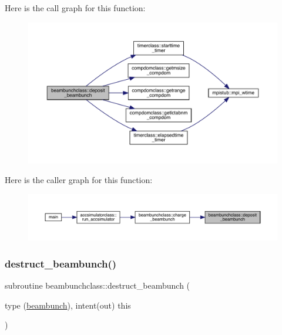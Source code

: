 Here is the call graph for this function\+:\nopagebreak
\begin{figure}[H]
\begin{center}
\leavevmode
\includegraphics[width=350pt]{namespacebeambunchclass_aa0438cba132ce3b2fdc8e053375c0097_cgraph}
\end{center}
\end{figure}
Here is the caller graph for this function\+:\nopagebreak
\begin{figure}[H]
\begin{center}
\leavevmode
\includegraphics[width=350pt]{namespacebeambunchclass_aa0438cba132ce3b2fdc8e053375c0097_icgraph}
\end{center}
\end{figure}
\mbox{\label{namespacebeambunchclass_a0fe1e4d236f209b18f75b272bf07782d}} 
\subsubsection{\texorpdfstring{destruct\_beambunch()}{destruct\_beambunch()}}
{\footnotesize\ttfamily subroutine beambunchclass\+::destruct\+\_\+beambunch (\begin{DoxyParamCaption}\item[{type (\mbox{\hyperlink{namespacebeambunchclass_structbeambunchclass_1_1beambunch}{beambunch}}), intent(out)}]{this }\end{DoxyParamCaption})}

